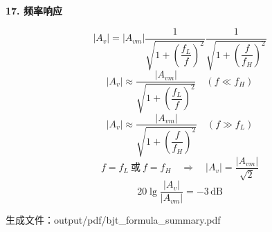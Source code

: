 \documentclass[12pt]{article}
\newcommand{\sectionbox}[1]{%
  \vspace{4pt}
  {\Large\bfseries\color{accent}#1}\par
  \vspace{2pt}
}
\newcommand{\note}[1]{{\color{muted}\small #1}}
\begin{document}
\sectionbox{17. 频率响应}

\begin{tcolorbox}
\[
\left|A_v\right|
=\left|A_{vm}\right|
\frac{1}{\sqrt{1+\left(\dfrac{f_L}{f}\right)^2}}
\frac{1}{\sqrt{1+\left(\dfrac{f}{f_H}\right)^2}}
\]
\[
\left|A_v\right|
\approx
\frac{\left|A_{vm}\right|}
{\sqrt{1+\left(\dfrac{f_L}{f}\right)^2}}
\quad (f\ll f_H)
\]
\[
\left|A_v\right|
\approx
\frac{\left|A_{vm}\right|}
{\sqrt{1+\left(\dfrac{f}{f_H}\right)^2}}
\quad (f\gg f_L)
\]
\[
f=f_L\ \text{或}\ f=f_H
\quad\Rightarrow\quad
\left|A_v\right|=\frac{\left|A_{vm}\right|}{\sqrt{2}}
\]
\[
20\lg\frac{\left|A_v\right|}{\left|A_{vm}\right|}
=-3\,\mathrm{dB}
\]
\end{tcolorbox}

\vfill
\note{生成文件：output/pdf/bjt_formula_summary.pdf}
\end{document}

